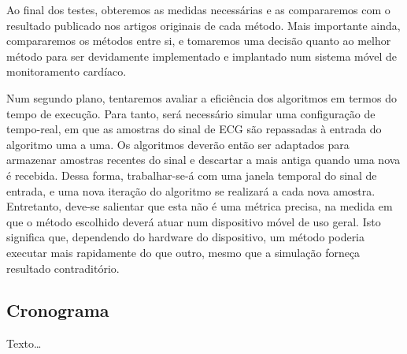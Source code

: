 Ao final dos testes, obteremos as medidas necessárias e as compararemos com o resultado publicado nos artigos originais de cada método. Mais importante ainda, compararemos os métodos entre si, e tomaremos uma decisão quanto ao melhor método para ser devidamente implementado e implantado num sistema móvel de monitoramento cardíaco.

Num segundo plano, tentaremos avaliar a eficiência dos algoritmos em termos do tempo de execução. Para tanto, será necessário simular uma configuração de tempo-real, em que as amostras do sinal de ECG são repassadas à entrada do algoritmo uma a uma. Os algoritmos deverão então ser adaptados para armazenar amostras recentes do sinal e descartar a mais antiga quando uma nova é recebida. Dessa forma, trabalhar-se-á com uma janela temporal do sinal de entrada, e uma nova iteração do algoritmo se realizará a cada nova amostra. Entretanto, deve-se salientar que esta não é uma métrica precisa, na medida em que o método escolhido deverá atuar num dispositivo móvel de uso geral. Isto significa que, dependendo  do hardware do dispositivo, um método poderia executar mais rapidamente do que outro, mesmo que a simulação forneça resultado contraditório.


\subsection{Cronograma}
Texto\ldots
